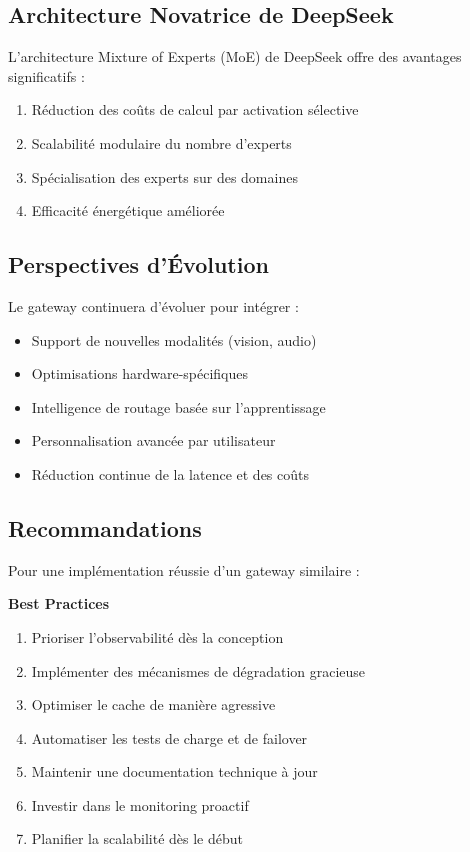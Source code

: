 \documentclass[12pt,a4paper]{article}
\begin{document}
\subsection{Architecture Novatrice de DeepSeek}

L'architecture Mixture of Experts (MoE) de DeepSeek offre des avantages significatifs :

\begin{enumerate}[noitemsep]
    \item Réduction des coûts de calcul par activation sélective
    \item Scalabilité modulaire du nombre d'experts
    \item Spécialisation des experts sur des domaines
    \item Efficacité énergétique améliorée
\end{enumerate}

\subsection{Perspectives d'Évolution}

Le gateway continuera d'évoluer pour intégrer :
\begin{itemize}[noitemsep]
    \item Support de nouvelles modalités (vision, audio)
    \item Optimisations hardware-spécifiques
    \item Intelligence de routage basée sur l'apprentissage
    \item Personnalisation avancée par utilisateur
    \item Réduction continue de la latence et des coûts
\end{itemize}

\subsection{Recommandations}

Pour une implémentation réussie d'un gateway similaire :

\begin{tcolorbox}[colback=green!5, colframe=green!50!black]
\textbf{Best Practices}
\begin{enumerate}[noitemsep]
    \item Prioriser l'observabilité dès la conception
    \item Implémenter des mécanismes de dégradation gracieuse
    \item Optimiser le cache de manière agressive
    \item Automatiser les tests de charge et de failover
    \item Maintenir une documentation technique à jour
    \item Investir dans le monitoring proactif
    \item Planifier la scalabilité dès le début
\end{enumerate}
\end{tcolorbox}
\end{document}
